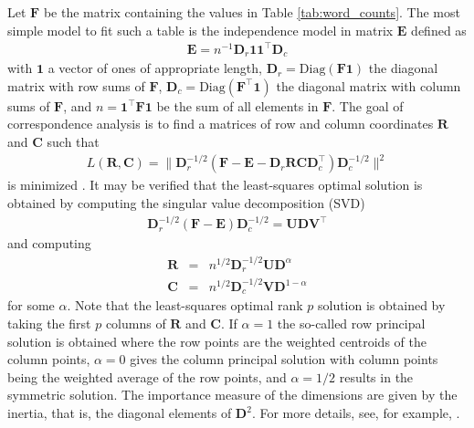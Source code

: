 \documentclass[
]{jdssv}
\begin{document}
Let \(\ensuremath{\mathbf{F}}\) be the matrix containing the values in
Table \ref{tab:word_counts}. The most simple model to fit such a table
is the independence model in matrix \(\ensuremath{\mathbf{E}}\) defined
as \begin{eqnarray*}
  \ensuremath{\mathbf{E}} = n^{-1}\ensuremath{\mathbf{D}}_r \ensuremath{\mathbf{11}}^\top \ensuremath{\mathbf{D}}_c
\end{eqnarray*} with \(\ensuremath{\mathbf{1}}\) a vector of ones of
appropriate length,
\(\ensuremath{\mathbf{D}}_r = \textrm{Diag}(\ensuremath{\mathbf{F1}})\)
the diagonal matrix with row sums of \(\ensuremath{\mathbf{F}}\),
\(\ensuremath{\mathbf{D}}_c = \textrm{Diag}(\ensuremath{\mathbf{F^\top 1}})\)
the diagonal matrix with column sums of \(\ensuremath{\mathbf{F}}\), and
\(n = \ensuremath{\mathbf{1^\top F1}}\) be the sum of all elements in
\(\ensuremath{\mathbf{F}}\). The goal of correspondence analysis is to
find a matrices of row and column coordinates
\(\ensuremath{\mathbf{R}}\) and \(\ensuremath{\mathbf{C}}\) such that
\begin{eqnarray*}
  L(\ensuremath{\mathbf{R}}, \ensuremath{\mathbf{C}}) = \|\ensuremath{\mathbf{D}}_r^{-1/2} (\ensuremath{\mathbf{F}} - \ensuremath{\mathbf{E}} - \ensuremath{\mathbf{D}}_r\ensuremath{\mathbf{RC}}\ensuremath{\mathbf{D}}_c^\top) \ensuremath{\mathbf{D}}_c^{-1/2}\|^2
\end{eqnarray*} is minimized
\citep[see, for example,][]{vandeveldenetal2009seriation}. It may be
verified that the least-squares optimal solution is obtained by
computing the singular value decomposition (SVD) \begin{eqnarray*}
  \ensuremath{\mathbf{D}}_r^{-1/2} (\ensuremath{\mathbf{F}} - \ensuremath{\mathbf{E}})\ensuremath{\mathbf{D}}_c^{-1/2} = \ensuremath{\mathbf{UDV}}^\top
\end{eqnarray*} and computing \begin{eqnarray*}
  \ensuremath{\mathbf{R}} &=& n^{1/2}\ensuremath{\mathbf{D}}_r^{-1/2} \ensuremath{\mathbf{UD}}^{\alpha}\\
  \ensuremath{\mathbf{C}} &=& n^{1/2}\ensuremath{\mathbf{D}}_c^{-1/2} \ensuremath{\mathbf{VD}}^{1-\alpha}
\end{eqnarray*} for some \(\alpha\). Note that the least-squares optimal
rank \(p\) solution is obtained by taking the first \(p\) columns of
\(\ensuremath{\mathbf{R}}\) and \(\ensuremath{\mathbf{C}}\). If
\(\alpha = 1\) the so-called row principal solution is obtained where
the row points are the weighted centroids of the column points,
\(\alpha = 0\) gives the column principal solution with column points
being the weighted average of the row points, and \(\alpha = 1/2\)
results in the symmetric solution. The importance measure of the
dimensions are given by the inertia, that is, the diagonal elements of
\(\ensuremath{\mathbf{D}}^2\). For more details, see, for example,
\cite{greenacre2010biplots}.
\end{document}
